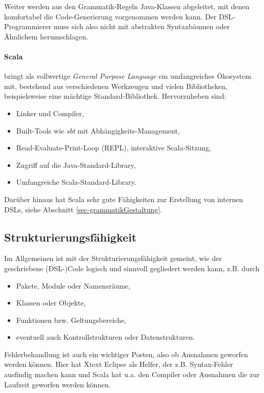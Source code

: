 Weiter werden aus den Grammatik-Regeln Java-Klassen abgeleitet, mit denen
komfortabel die Code-Generierung vorgenommen werden kann. Der DSL-Programmierer
muss sich also nicht mit abstrakten Syntaxbäumen oder Ähnlichem herumschlagen.

\paragraph{Scala} bringt als vollwertige \emph{General Purpose Language}
ein umfangreiches Ökosystem mit, bestehend aus verschiedenen Werkzeugen
und vielen Bibliotheken, beispielsweise eine mächtige Standard-Bibliothek.
Hervorzuheben sind:

\begin{itemize}
  \item Linker und Compiler,
  \item Built-Tools wie \emph{sbt} mit Abhängigkeits-Management,
  \item Read-Evaluate-Print-Loop (REPL), interaktive Scala-Sitzung,
  \item Zugriff auf die Java-Standard-Library,
  \item Umfangreiche Scala-Standard-Library.
\end{itemize}

Darüber hinaus hat Scala sehr gute Fähigkeiten zur Erstellung von internen
DSLs, siehe Abschnitt \ref{sec-grammatikGestaltung}.


\subsection{Strukturierungsfähigkeit}\label{sec-strukturierungsfaehigkeit}

Im Allgemeinen ist mit der Strukturierungsfähigkeit gemeint, wie der
geschriebene (DSL-)Code logisch und sinnvoll gegliedert werden kann,
z.B. durch

\begin{itemize}
  \item Pakete, Module oder Namensräume,
  \item Klassen oder Objekte,
  \item Funktionen bzw. Geltungsbereiche,
  \item eventuell auch Kontrollstrukturen oder Datenstrukturen.
\end{itemize}

Fehlerbehandlung ist auch ein wichtiger Posten, also ob Ausnahmen
geworfen werden können. Hier hat Xtext Eclipse als Helfer, der
z.B. Syntax-Fehler ausfindig machen kann und Scala hat u.a. den Compiler
oder Ausnahmen die zur Laufzeit geworfen werden können.

